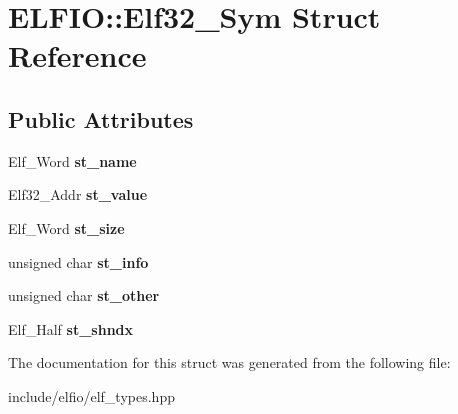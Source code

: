 \hypertarget{struct_e_l_f_i_o_1_1_elf32___sym}{}\section{E\+L\+F\+IO\+:\+:Elf32\+\_\+\+Sym Struct Reference}
\label{struct_e_l_f_i_o_1_1_elf32___sym}
\subsection*{Public Attributes}
\begin{DoxyCompactItemize}
\item 
Elf\+\_\+\+Word {\bfseries st\+\_\+name}\hypertarget{struct_e_l_f_i_o_1_1_elf32___sym_adda61485367b98828b6ef4aa48fdc6f9}{}\label{struct_e_l_f_i_o_1_1_elf32___sym_adda61485367b98828b6ef4aa48fdc6f9}

\item 
Elf32\+\_\+\+Addr {\bfseries st\+\_\+value}\hypertarget{struct_e_l_f_i_o_1_1_elf32___sym_a77b921200e749b6800f42c117d7a57f4}{}\label{struct_e_l_f_i_o_1_1_elf32___sym_a77b921200e749b6800f42c117d7a57f4}

\item 
Elf\+\_\+\+Word {\bfseries st\+\_\+size}\hypertarget{struct_e_l_f_i_o_1_1_elf32___sym_afe5af4c0d4f244cb46c64d82b1f20db4}{}\label{struct_e_l_f_i_o_1_1_elf32___sym_afe5af4c0d4f244cb46c64d82b1f20db4}

\item 
unsigned char {\bfseries st\+\_\+info}\hypertarget{struct_e_l_f_i_o_1_1_elf32___sym_ad2288e2662923b90c7df6d212440cb71}{}\label{struct_e_l_f_i_o_1_1_elf32___sym_ad2288e2662923b90c7df6d212440cb71}

\item 
unsigned char {\bfseries st\+\_\+other}\hypertarget{struct_e_l_f_i_o_1_1_elf32___sym_abc2eb28f9627ba393277b6c0607a955b}{}\label{struct_e_l_f_i_o_1_1_elf32___sym_abc2eb28f9627ba393277b6c0607a955b}

\item 
Elf\+\_\+\+Half {\bfseries st\+\_\+shndx}\hypertarget{struct_e_l_f_i_o_1_1_elf32___sym_a8a18baf59c5ddcbe937daf887956a3c6}{}\label{struct_e_l_f_i_o_1_1_elf32___sym_a8a18baf59c5ddcbe937daf887956a3c6}

\end{DoxyCompactItemize}


The documentation for this struct was generated from the following file\+:\begin{DoxyCompactItemize}
\item 
include/elfio/elf\+\_\+types.\+hpp\end{DoxyCompactItemize}
